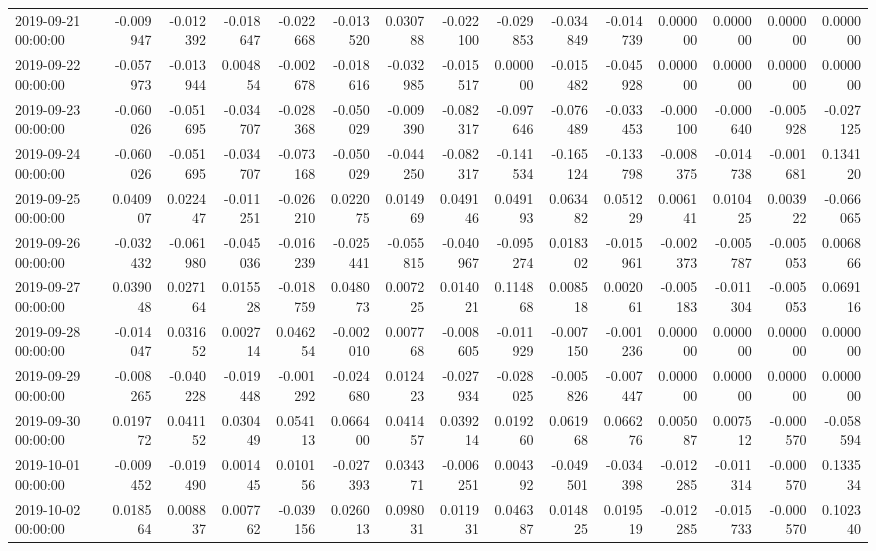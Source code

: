 \begin{tabular}{lrrrrrrrrrrrrrr}
2019-09-21 00:00:00 & -0.009947 & -0.012392 & -0.018647 & -0.022668 & -0.013520 & 0.030788 & -0.022100 & -0.029853 & -0.034849 & -0.014739 & 0.000000 & 0.000000 & 0.000000 & 0.000000 \\
2019-09-22 00:00:00 & -0.057973 & -0.013944 & 0.004854 & -0.002678 & -0.018616 & -0.032985 & -0.015517 & 0.000000 & -0.015482 & -0.045928 & 0.000000 & 0.000000 & 0.000000 & 0.000000 \\
2019-09-23 00:00:00 & -0.060026 & -0.051695 & -0.034707 & -0.028368 & -0.050029 & -0.009390 & -0.082317 & -0.097646 & -0.076489 & -0.033453 & -0.000100 & -0.000640 & -0.005928 & -0.027125 \\
2019-09-24 00:00:00 & -0.060026 & -0.051695 & -0.034707 & -0.073168 & -0.050029 & -0.044250 & -0.082317 & -0.141534 & -0.165124 & -0.133798 & -0.008375 & -0.014738 & -0.001681 & 0.134120 \\
2019-09-25 00:00:00 & 0.040907 & 0.022447 & -0.011251 & -0.026210 & 0.022075 & 0.014969 & 0.049146 & 0.049193 & 0.063482 & 0.051229 & 0.006141 & 0.010425 & 0.003922 & -0.066065 \\
2019-09-26 00:00:00 & -0.032432 & -0.061980 & -0.045036 & -0.016239 & -0.025441 & -0.055815 & -0.040967 & -0.095274 & 0.018302 & -0.015961 & -0.002373 & -0.005787 & -0.005053 & 0.006866 \\
2019-09-27 00:00:00 & 0.039048 & 0.027164 & 0.015528 & -0.018759 & 0.048073 & 0.007225 & 0.014021 & 0.114868 & 0.008518 & 0.002061 & -0.005183 & -0.011304 & -0.005053 & 0.069116 \\
2019-09-28 00:00:00 & -0.014047 & 0.031652 & 0.002714 & 0.046254 & -0.002010 & 0.007768 & -0.008605 & -0.011929 & -0.007150 & -0.001236 & 0.000000 & 0.000000 & 0.000000 & 0.000000 \\
2019-09-29 00:00:00 & -0.008265 & -0.040228 & -0.019448 & -0.001292 & -0.024680 & 0.012423 & -0.027934 & -0.028025 & -0.005826 & -0.007447 & 0.000000 & 0.000000 & 0.000000 & 0.000000 \\
2019-09-30 00:00:00 & 0.019772 & 0.041152 & 0.030449 & 0.054113 & 0.066400 & 0.041457 & 0.039214 & 0.019260 & 0.061968 & 0.066276 & 0.005087 & 0.007512 & -0.000570 & -0.058594 \\
2019-10-01 00:00:00 & -0.009452 & -0.019490 & 0.001445 & 0.010156 & -0.027393 & 0.034371 & -0.006251 & 0.004392 & -0.049501 & -0.034398 & -0.012285 & -0.011314 & -0.000570 & 0.133534 \\
2019-10-02 00:00:00 & 0.018564 & 0.008837 & 0.007762 & -0.039156 & 0.026013 & 0.098031 & 0.011931 & 0.046387 & 0.014825 & 0.019519 & -0.012285 & -0.015733 & -0.000570 & 0.102340 \\

\end{tabular}
